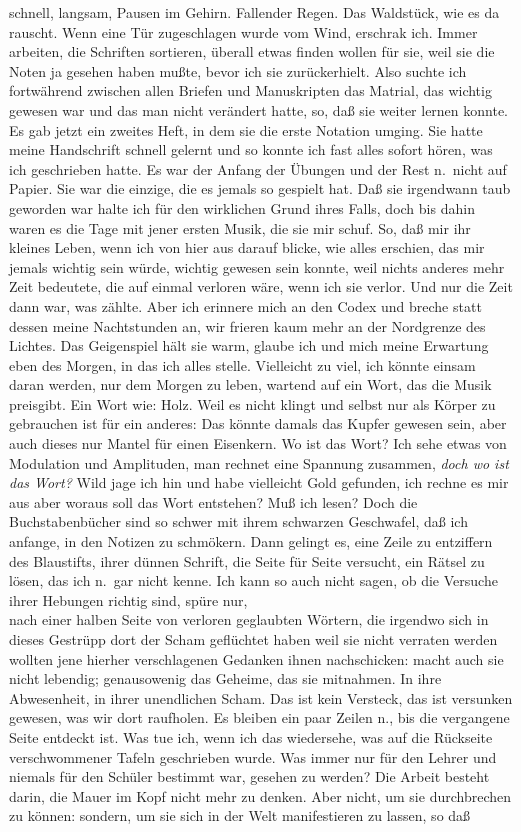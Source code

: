 \documentclass[
]{article}
\begin{document}
schnell, langsam, Pausen im Gehirn. Fallender Regen. Das Waldstück, wie
es da rauscht. Wenn eine Tür zugeschlagen wurde vom Wind, erschrak ich.
Immer arbeiten, die Schriften sortieren, überall etwas finden wollen für
sie, weil sie die Noten ja gesehen haben mußte, bevor ich sie
zurückerhielt. Also suchte ich fortwährend zwischen allen Briefen und
Manuskripten das Matrial, das wichtig gewesen war und das man nicht
verändert hatte, so, daß sie weiter lernen konnte. Es gab jetzt ein
zweites Heft, in dem sie die erste Notation umging. Sie hatte meine
Handschrift schnell gelernt und so konnte ich fast alles sofort hören,
was ich geschrieben hatte. Es war der Anfang der Übungen und der Rest
n.~nicht auf Papier. Sie war die einzige, die es jemals so gespielt hat.
Daß sie irgendwann taub geworden war halte ich für den wirklichen Grund
ihres Falls, doch bis dahin waren es die Tage mit jener ersten Musik,
die sie mir schuf. So, daß mir ihr kleines Leben, wenn ich von hier aus
darauf blicke, wie alles erschien, das mir jemals wichtig sein würde,
wichtig gewesen sein konnte, weil nichts anderes mehr Zeit bedeutete,
die auf einmal verloren wäre, wenn ich sie verlor. Und nur die Zeit dann
war, was zählte. Aber ich erinnere mich an den Codex und breche statt
dessen meine Nachtstunden an, wir frieren kaum mehr an der Nordgrenze
des Lichtes. Das Geigenspiel hält sie warm, glaube ich und mich meine
Erwartung eben des Morgen, in das ich alles stelle. Vielleicht zu viel,
ich könnte einsam daran werden, nur dem Morgen zu leben, wartend auf ein
Wort, das die Musik preisgibt. Ein Wort wie: Holz. Weil es nicht klingt
und selbst nur als Körper zu gebrauchen ist für ein anderes: Das könnte
damals das Kupfer gewesen sein, aber auch dieses nur Mantel für einen
Eisenkern. Wo ist das Wort? Ich sehe etwas von Modulation und
Amplituden, man rechnet eine Spannung zusammen, \emph{doch wo ist das
Wort?} Wild jage ich hin und habe vielleicht Gold gefunden, ich rechne
es mir aus aber woraus soll das Wort entstehen? Muß ich lesen? Doch die
Buchstabenbücher sind so schwer mit ihrem schwarzen Geschwafel, daß ich
anfange, in den Notizen zu schmökern. Dann gelingt es, eine Zeile zu
entziffern des Blaustifts, ihrer dünnen Schrift, die Seite für Seite
versucht, ein Rätsel zu lösen, das ich n.~gar nicht kenne. Ich kann so
auch nicht sagen, ob die Versuche ihrer Hebungen richtig sind, spüre
nur,\\
nach einer halben Seite von verloren geglaubten Wörtern, die irgendwo
sich in dieses Gestrüpp dort der Scham geflüchtet haben weil sie nicht
verraten werden wollten jene hierher verschlagenen Gedanken ihnen
nachschicken: macht auch sie nicht lebendig; genausowenig das Geheime,
das sie mitnahmen. In ihre Abwesenheit, in ihrer unendlichen Scham. Das
ist kein Versteck, das ist versunken gewesen, was wir dort raufholen. Es
bleiben ein paar Zeilen n., bis die vergangene Seite entdeckt ist. Was
tue ich, wenn ich das wiedersehe, was auf die Rückseite verschwommener
Tafeln geschrieben wurde. Was immer nur für den Lehrer und niemals für
den Schüler bestimmt war, gesehen zu werden? Die Arbeit besteht darin,
die Mauer im Kopf nicht mehr zu denken. Aber nicht, um sie durchbrechen
zu können: sondern, um sie sich in der Welt manifestieren zu lassen, so
daß
\end{document}

